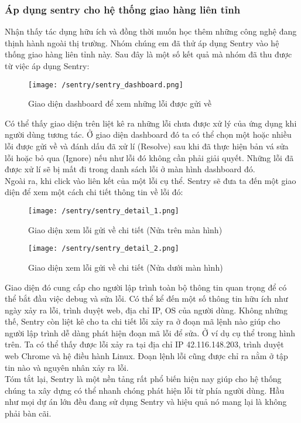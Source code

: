 				
			
			\subsubsection{Áp dụng sentry cho hệ thống giao hàng liên tỉnh}
			 	Nhận thấy tác dụng hữu ích và đồng thời muốn học thêm những công nghệ đang thịnh hành ngoài thị trường. Nhóm chúng em đã thử áp dụng Sentry vào hệ thống giao hàng liên tỉnh này. Sau đây là một số kết quả mà nhóm đã thu được từ việc áp dụng Sentry:
			 	
			 	\begin{figure}[H]
			 		\texttt{[image: /sentry/sentry\_dashboard.png]}
			 		\centering
			 		\caption{Giao diện dashboard để xem những lỗi được gửi về}
			 	\end{figure}
		 	
		 		Có thể thấy giao diện trên liệt kê ra những lỗi chưa được xử lý của ứng dụng khi người dùng tương tác. Ở giao diện dashboard đó ta có thể chọn một hoặc nhiều lỗi được gửi về và đánh dấu đã xử lí (Resolve) sau khi đã thực hiện bản vá sửa lỗi hoặc bỏ qua (Ignore) nếu như lỗi đó không cần phải giải quyết. Những lỗi đã được xử lí sẽ bị mất đi trong danh sách lỗi ở màn hình dashboard đó. \\
		 		
		 		Ngoài ra, khi click vào liên kết của một lỗi cụ thể. Sentry sẽ đưa ta đến một giao diện để xem một cách chi tiết thông tin về lỗi đó:
		 		
			 	\begin{figure}[H]
			 		\texttt{[image: /sentry/sentry\_detail\_1.png]}
			 		\centering
			 		\caption{Giao diện xem lỗi gửi về chi tiết (Nửa trên màn hình)}
			 	\end{figure}
		 	
		 		\begin{figure}[H]
		 			\texttt{[image: /sentry/sentry\_detail\_2.png]}
		 			\centering
		 			\caption{Giao diện xem lỗi gửi về chi tiết (Nửa dưới màn hình)}
		 		\end{figure}
			 	
			 	Giao diện đó cung cấp cho người lập trình toàn bộ thông tin quan trọng để có thể bắt đầu việc debug và sửa lỗi. Có thể kể đến một số thông tin hữu ích như ngày xảy ra lỗi, trình duyệt web, địa chỉ IP, OS của người dùng. Không những thế, Sentry còn liệt kê cho ta chi tiết lỗi xảy ra ở đoạn mã lệnh nào giúp cho người lập trình dễ dàng phát hiện đoạn mã lỗi để sửa. Ở ví dụ cụ thể trong hình trên. Ta có thể thấy được lỗi xảy ra tại địa chỉ IP 42.116.148.203, trình duyệt web Chrome và hệ điều hành Linux. Đoạn lệnh lỗi cũng được chỉ ra nằm ở tập tin nào và nguyên nhân xảy ra lỗi. \\
			 	
			 	Tóm tắt lại, Sentry là một nền tảng rất phổ biến hiện nay giúp cho hệ thống chúng ta xây dựng có thể nhanh chóng phát hiện lỗi từ phía người dùng. Hầu như mọi dự án lớn đều đang sử dụng Sentry và hiệu quả nó mang lại là không phải bàn cãi.
		
	